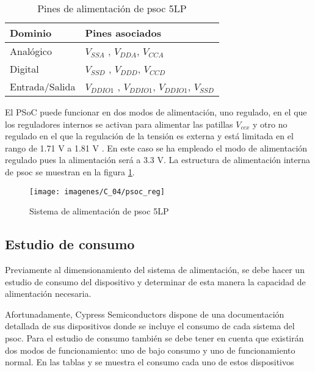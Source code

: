 \begin{table}[!ht]
\centering
\begin{tabular}{ll}
\hline
Dominio        & Pines asociados                                   \\ \hline
Analógico      & $V_{SSA}$ , $V_{DDA}$, $V_{CCA}$                  \\ 
Digital        & $V_{SSD}$ , $V_{DDD}$, $V_{CCD}$                  \\ 
Entrada/Salida & $V_{DDIO1}$ , $V_{DDIO1}$, $V_{DDIO1}$, $V_{SSD}$ \\ 
\end{tabular}
\caption{Pines de alimentación de \acrshort{psoc} 5LP}
\label{tab:alim}
\end{table}


El PSoC puede funcionar en dos modos de alimentación, uno regulado, en el que los reguladores internos se activan para alimentar las patillas $V_{ccx}$ y otro no regulado en el que la regulación de la tensión es externa y está limitada en el rango de 1.71 V a 1.81 V \cite{CY_TRM}. En este caso se ha empleado el modo de alimentación regulado pues la alimentación será a 3.3 V. La estructura de alimentación interna de \acrshort{psoc} se muestran en la figura \ref{fig:psoc_reg}.

\begin{figure}[!ht]
	\center
	\texttt{[image: imagenes/C\_04/psoc\_reg]}
	\caption{Sistema de alimentación de \acrshort{psoc} 5LP}
	\label{fig:psoc_reg}
\end{figure}


\subsection{Estudio de consumo}

Previamente al dimensionamiento del sistema de alimentación, se debe hacer un estudio de consumo del dispositivo y determinar de esta manera la capacidad de alimentación necesaria. 

Afortunadamente, Cypress Semiconductors dispone de una documentación detallada de sus dispositivos donde se incluye el consumo de cada sistema del \acrshort{psoc}. Para el estudio de consumo también se debe tener en cuenta que existirán dos modos de funcionamiento: uno de bajo consumo y uno de funcionamiento normal. En las tablas y  se muestra el consumo cada uno de estos dispositivos

